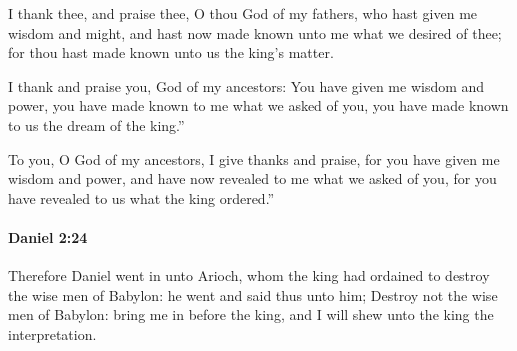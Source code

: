 			\begin{versebox}
					\item[BHS] 
					\item[LXX] 
					\item[ASV] I thank thee, and praise thee, O thou God of my fathers, who hast given me wisdom and might, and hast now made known unto me what we desired of thee; for thou hast made known unto us the king's matter.
					\item[NIV] I thank and praise you, God of my ancestors: You have given me wisdom and power, you have made known to me what we asked of you, you have made known to us the dream of the king.”
					\item[NRSV] To you, O God of my ancestors, I give thanks and praise, for you have given me wisdom and power, and have now revealed to me what we asked of you, for you have revealed to us what the king ordered.”
			\end{versebox}

		\paragraph{Daniel 2:24} %
			\label{DANIEL-2-24}

			Therefore Daniel went in unto Arioch, whom the king had ordained to destroy the wise men of Babylon: he went and said thus unto him; Destroy not the wise men of Babylon: bring me in before the king, and I will shew unto the king the interpretation.

